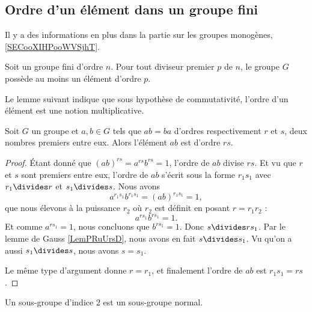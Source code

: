 \subsection{Ordre d'un élément dans un groupe fini}

Il y a des informations en plus dans la partie sur les groupes monogènes, \ref{SECooXIHPooWVSjhT}.

\begin{theorem}    \label{THOooSUWKooICbzqM}
    Soit un groupe fini d'ordre \( n\). Pour tout diviseur premier \( p\) de \( n\), le groupe \( G\) possède au moins un élément d'ordre \( p\).
\end{theorem}

Le lemme suivant indique que sous hypothèse de commutativité, l'ordre d'un élément est une notion multiplicative.
\begin{lemma}    \label{LemyETtdy}
    Soit \( G\) un groupe et \( a,b\in G\) tels que \( ab=ba\) d'ordres respectivement \( r\) et \( s\), deux nombres premiers entre eux. Alors l'élément \( ab\) est d'ordre \( rs\).
\end{lemma}

\begin{proof}
    Étant donné que \( (ab)^{rs}=a^{rs}b^{rs}=1\), l'ordre de \( ab\) divise \( rs\). Et vu que \( r\) et \( s\) sont premiers entre eux, l'ordre de \( ab\) s'écrit sous la forme \( r_1s_1\) avec \( r_1\divides r\) et \( s_1\divides s\). Nous avons
    \begin{equation}
        a^{r_1s_1}b^{r_1s_1}=(ab)^{r_1s_1}=1,
    \end{equation}
    que nous élevons à la puissance \( r_2\) où \( r_2\) est définit en posant \(r=r_1r_2\) :
    \begin{equation}
        a^{rs_1}b^{rs_1}=1.
    \end{equation}
    Et comme \( a^{rs_1}=1\), nous concluons que \( b^{rs_1}=1\). Donc \( s\divides rs_1\). Par le lemme de Gauss \ref{LemPRuUrsD}, nous avons en fait \( s\divides s_1\). Vu qu'on a aussi \( s_1\divides s\), nous avons \( s=s_1\).

    Le même type d'argument donne \( r=r_1\), et finalement l'ordre de \( ab\) est \( r_1s_1=rs\).
\end{proof}

\begin{lemma}    \label{LemSkIOOG}
    Un sous-groupe d'indice \( 2\) est un sous-groupe normal.
\end{lemma}

